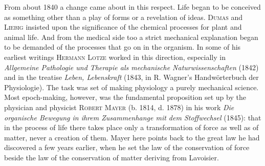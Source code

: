 \documentclass[12pt,a4paper]{book}
\begin{document}
From about 1840 a change came about in this respect. Life began to be conceived
as something other than a play of forms or a revelation of ideas.
\textsc{Dumas} and \textsc{Liebig} insisted upon the significance of the
chemical processes for plant and animal life. And from the medical side too a
strict mechanical explanation began to be demanded of the processes that go on
in the organism. In some of his earliest writings \textsc{Hermann Lotze} worked
in this direction, especially in \textit{Allgemeine Pathologie und Therapie als
mechanische Naturwissenschaften} (1842) and in the treatise \textit{Leben,
Lebenskraft} (1843, in R. Wagner's Handwörterbuch der Physiologie). The task was
set of making physiology a purely mechanical science. Most epoch-making,
however, was the fundamental proposition set up by the physician and physicist
\textsc{Robert Mayer} (b. 1814, d. 1878) in his work \textit{Die organische
Bewegung in ihrem Zusammenhange mit dem Stoffwechsel} (1845): that in the
process of life there takes place only a transformation of force as well as of
matter, never a creation of them. Mayer here points back to the great law he had
discovered a few years earlier, when he set the law of the conservation of force
beside the law of the conservation of matter deriving from Lavoisier.
\end{document}
